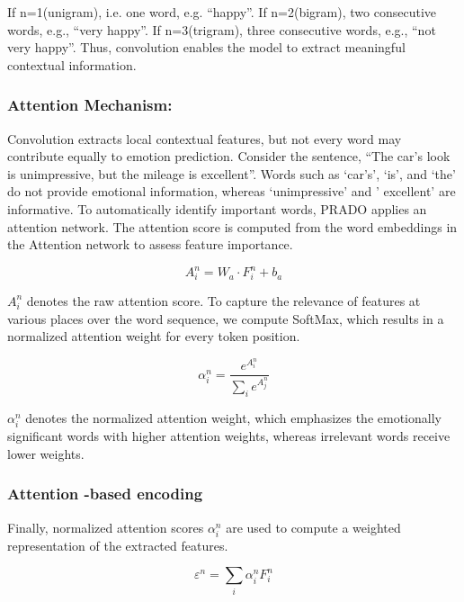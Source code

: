 If n=1(unigram), i.e. one word, e.g. “happy”. If n=2(bigram), two consecutive words, e.g., “very happy”. If n=3(trigram), three consecutive words, e.g., “not very happy”. Thus, convolution enables the model to extract meaningful contextual information.

\subsubsection{Attention Mechanism:}
Convolution extracts local contextual features, but not every word may contribute equally to emotion prediction. Consider the sentence, “The car’s look is unimpressive, but the mileage is excellent”.  Words such as ‘car’s’, ‘is’, and ‘the’ do not provide emotional information, whereas ‘unimpressive’ and ' excellent’ are informative. To automatically identify important words, PRADO applies an attention network. The attention score is computed from the word embeddings in the Attention network to assess feature importance.

\begin{equation}
  A_{i}^{n} = W_{a} \cdot F_{i}^{n} + b_{a}
  \label{eq:ch3_3_4}
\end{equation}

\noindent $A_{i}^{n}$ denotes the raw attention score. To capture the relevance of features at various places over the word sequence, we compute SoftMax, which results in a normalized attention weight for every token position.

\begin{equation}
  \alpha_{i}^{n} = \frac{e^{A_{i}^{n}}}{\sum_{i} e^{A_{j}^{n}}}
  \label{eq:ch3_3_5}
\end{equation}

\noindent $\alpha_{i}^{n}$ denotes the normalized attention weight, which emphasizes the emotionally significant words with higher attention weights, whereas irrelevant words receive lower weights.

\subsubsection{Attention -based encoding}
Finally, normalized attention scores $\alpha_{i}^{n}$ are used to compute a weighted representation of the extracted features.

\begin{equation}
  \varepsilon^{n} = \sum_{i} \alpha_{i}^{n} F_{i}^{n}
  \label{eq:ch3_3_6}
\end{equation}

